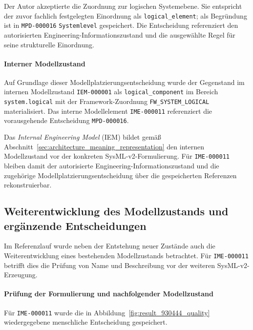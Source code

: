 Der Autor akzeptierte die Zuordnung zur logischen Systemebene. Sie
entspricht der zuvor fachlich festgelegten Einordnung als
\texttt{logical\_element}; als Begründung ist in
\texttt{MPD-000016} \texttt{Systemlevel} gespeichert. Die Entscheidung
referenziert den autorisierten Engineering-Informationszustand und die
ausgewählte Regel für seine strukturelle Einordnung.
\newpage
\paragraph{Interner Modellzustand}

Auf Grundlage dieser Modellplatzierungsentscheidung wurde der Gegenstand im
internen Modellzustand \texttt{IEM-000001} als
\texttt{logical\_component} im Bereich \texttt{system.logical} mit der
Framework-Zuordnung \texttt{FW\_SYSTEM\_LOGICAL} materialisiert. Das
interne Modellelement \texttt{IME-000011} referenziert die vorausgehende
Entscheidung \texttt{MPD-000016}.

Das \emph{Internal Engineering Model} (IEM) bildet gemäß
Abschnitt~\ref{sec:architecture_meaning_representation} den internen
Modellzustand vor der konkreten SysML-v2-Formulierung. Für
\texttt{IME-000011} bleiben damit der autorisierte
Engineering-Informationszustand und die zugehörige
Modellplatzierungsentscheidung über die gespeicherten Referenzen
rekonstruierbar.

\subsection{Weiterentwicklung des Modellzustands und ergänzende Entscheidungen}
\label{sec:results_traceability_additional}

Im Referenzlauf wurde neben der Entstehung neuer Zustände auch die
Weiterentwicklung eines bestehenden Modellzustands betrachtet. Für
\texttt{IME-000011} betrifft dies die Prüfung von Name und Beschreibung vor
der weiteren SysML-v2-Erzeugung.

\paragraph{Prüfung der Formulierung und nachfolgender Modellzustand}

Für \texttt{IME-000011} wurde die in
Abbildung~\ref{fig:result_930444_quality} wiedergegebene menschliche
Entscheidung gespeichert.

